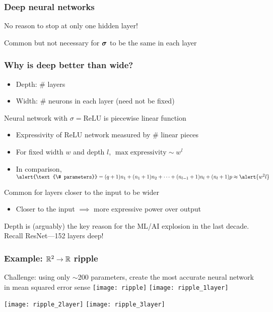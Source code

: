 \begin{frame}
    \frametitle{Deep neural networks}

    No reason to stop at only one hidden layer!

    \vspace{1mm}
    
    \vspace{1mm}

    Common but not necessary for $\bm{\sigma}$ to be the same in each layer
\end{frame}

\begin{frame}
    \frametitle{Why is deep better than wide?}
    \begin{itemize}
        \item Depth: \# layers
        \item Width: \# neurons in each layer (need not be fixed)
    \end{itemize}
    \pause

    Neural network with $\sigma = \text{ReLU}$ is piecewise linear function
    \begin{itemize}
        \item \alert{Expressivity} of ReLU network measured by \# linear pieces
        \item For fixed width $w$ and depth $l$, \alert{$\max \text{expressivity} \sim w^l$} \citep{Pascanu13,MontufarNIPS14,Chen16}
        \item In comparison, $\alert{\text{\# parameters}} = (q + 1) n_1 + (n_1 + 1) n_2 + \cdots + (n_{l-1} + 1) n_l + (n_l + 1) p \approx \alert{w^2 l}$
    \end{itemize}
    \pause

    Common for layers closer to the input to be wider
    \begin{itemize}
        \item Closer to the input $\implies$ more expressive power over output \citep{RaghuICML17}
    \end{itemize}
    \pause

    \begin{block}{}
        Depth is (arguably) the key reason for the ML/AI explosion in the last decade.
        Recall ResNet---152 layers deep!
    \end{block}
\end{frame}

\begin{frame}
    \frametitle{Example: $\mathbb{R}^2 \to \mathbb{R}$ ripple}


    Challenge: using only $\sim$200 parameters, create the most accurate neural network in mean squared error sense
    \texttt{[image: ripple]}
    \hfill
    \texttt{[image: ripple\_1layer]}

    \texttt{[image: ripple\_2layer]}
    \hfill
    \texttt{[image: ripple\_3layer]}
\end{frame}

